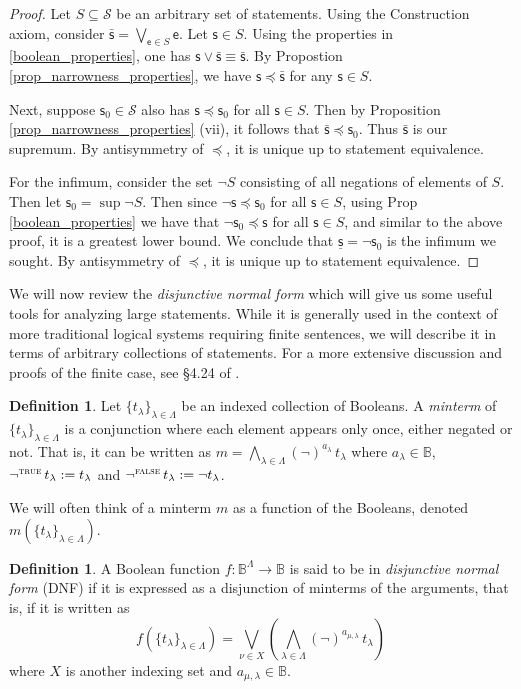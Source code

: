 \documentclass[psamsfonts]{amsart}
\theoremstyle{definition}
\newtheorem{defn}[thm]{Definition}
\theoremstyle{remark}
\numberwithin{equation}{section}
\def\TRUE{\textsc{true}}
\def\FALSE{\textsc{false}}
\def\stmtSet{\mathcal{S}}
\def\narrower{\preccurlyeq}
\def\bigAND{\bigwedge}
\def\OR{\vee}
\def\bigOR{\bigvee}
\def\NOT{\neg}
\newcommand{\stmt}[1][s] {\mathsf{#1}}
\begin{document}
\begin{proof}
	Let $S \subseteq \stmtSet$ be an arbitrary set of statements. Using the Construction axiom, consider $\bar{\stmt}=\bigOR\limits_{\stmt[e] \in S} \stmt[e]$. Let $\stmt \in S$. Using the properties in \ref{boolean_properties}, one has $\stmt \OR \bar{\stmt} \equiv \bar{\stmt}$. By Propostion \ref{prop_narrowness_properties}, we have $\stmt \narrower \bar{\stmt}$ for any $\stmt \in S$. 

Next, suppose $\stmt_0\in\mathcal{S}$ also has $\stmt\narrower\stmt_0$ for all $\stmt\in S$. Then by Proposition \ref{prop_narrowness_properties} (vii), it follows that $\bar{\stmt}\narrower\stmt_0$. Thus $\bar{\stmt}$ is our supremum. By antisymmetry of $\narrower$, it is unique up to statement equivalence. 

For the infimum, consider the set $\NOT S$ consisting of all negations of elements of $S$. Then let $\stmt_0 = \sup\NOT S$. Then since $\NOT\stmt \narrower \stmt_0$ for all $\stmt\in S$, using Prop \ref{boolean_properties} we have that $\NOT\stmt_0\narrower\stmt$ for all $\stmt\in S$, and similar to the above proof, it is a greatest lower bound. We conclude that $\underline{\stmt} =\NOT\stmt_0$ is the infimum we sought. By antisymmetry of $\narrower$, it is unique up to statement equivalence. 
\end{proof} 

We will now review the \emph{disjunctive normal form} which will give us some useful tools for analyzing large statements. While it is generally used in the context of more traditional logical systems requiring finite sentences, we will describe it in terms of arbitrary collections of statements. For a more extensive discussion and proofs of the finite case, see \S4.24 of \cite{lattices}. 

\begin{defn}
\label{def_minterm}
Let $\{t_{\lambda}\}_{\lambda\in\Lambda}$ be an indexed collection of Booleans. A \emph{minterm} of $\{t_{\lambda}\}_{\lambda\in\Lambda}$ is a conjunction where each element appears only once, either negated or not. That is, it can be written as $m = \bigAND \limits_{\lambda\in\Lambda} (\NOT)^{a_{\lambda}} \, t_{\lambda}$ where $a_{\lambda} \in \mathbb{B}$, $\NOT ^ \TRUE \, t_{\lambda} := t_{\lambda}$ and $\NOT ^ \FALSE \, t_{\lambda} := \NOT t_{\lambda}$.
\end{defn}
We will often think of a minterm $m$ as a function of the Booleans, denoted $m(\{t_{\lambda}\}_{\lambda\in\Lambda})$. 
\begin{defn}
\label{def_dnf}
A Boolean function $f:\mathbb{B}^{\Lambda}\to\mathbb{B}$ is said to be in \emph{disjunctive normal form} (DNF) if it is expressed as a disjunction of minterms of the arguments, that is, if it is written as
 $$f(\{t_{\lambda}\}_{\lambda\in\Lambda}) =\bigOR \limits_{\nu\in X} \left( \bigAND \limits_{\lambda\in\Lambda} (\NOT)^{a_{\mu,\lambda}} \, t_{\lambda} \right)$$ where $X$ is another indexing set and  $a_{\mu,\lambda} \in \mathbb{B}$. 
\end{defn}
\end{document}
